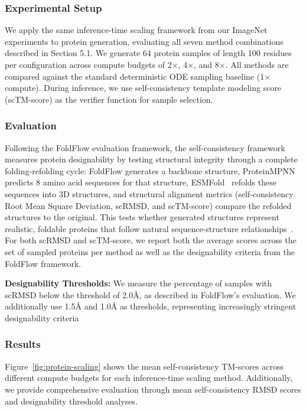 \documentclass{article}
\begin{document}
\subsubsection{Experimental Setup}

We apply the same inference-time scaling framework from our ImageNet experiments to protein generation, evaluating all seven method combinations described in Section 5.1. We generate 64 protein samples of length 100 residues per configuration across compute budgets of 2×, 4×, and 8×. All methods are compared against the standard deterministic ODE sampling baseline (1× compute). During inference, we use self-consistency template modeling score (scTM-score) as the verifier function for sample selection.

\subsubsection{Evaluation}

Following the FoldFlow evaluation framework, the self-consistency framework measures protein designability by testing structural integrity through a complete folding-refolding cycle: FoldFlow generates a backbone structure, ProteinMPNN~\cite{proteinmpnn} predicts 8 amino acid sequences for that structure, ESMFold~\cite{esmfold} refolds these sequences into 3D structures, and structural alignment metrics (self-consistency Root Mean Square Deviation, scRMSD, and scTM-score) compare the refolded structures to the original. This tests whether generated structures represent realistic, foldable proteins that follow natural sequence-structure relationships~\cite{foldflow2}. For both scRMSD and scTM-score, we report both the average scores across the set of sampled proteins per method as well as the designability criteria from the FoldFlow framework.

\textbf{Designability Thresholds:} We measure the percentage of samples with scRMSD below the threshold of 2.0Å, as described in FoldFlow's evaluation. We additionally use 1.5Å and 1.0Å as thresholds, representing increasingly stringent designability criteria

\subsubsection{Results}

Figure~\ref{fig:protein-scaling} shows the mean self-consistency TM-scores across different compute budgets for each inference-time scaling method. Additionally, we provide comprehensive evaluation through mean self-consistency RMSD scores and designability threshold analyses.
\end{document}
